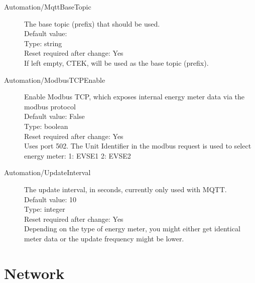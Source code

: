 \begin{description}
\item[Automation/MqttBaseTopic] The base topic (prefix) that should be used.\\
  Default value: \\
  Type: string\\
  Reset required after change: Yes\\
  If left empty, CTEK, will be used as the base topic (prefix).\\

\item[Automation/ModbusTCPEnable] Enable Modbus TCP, which exposes internal energy meter data via the modbus protocol\\
  Default value: False\\
  Type: boolean\\
  Reset required after change: Yes\\
  Uses port 502. The Unit Identifier in the modbus request is used to select energy meter: 1: EVSE1 2: EVSE2\\

\item[Automation/UpdateInterval] The update interval, in seconds, currently only used with MQTT.\\
  Default value: 10\\
  Type: integer\\
  Reset required after change: Yes\\
  Depending on the type of energy meter, you might either get identical meter data or the update frequency might be lower.\\

\end{description}
\pagebreak\section{Network}

